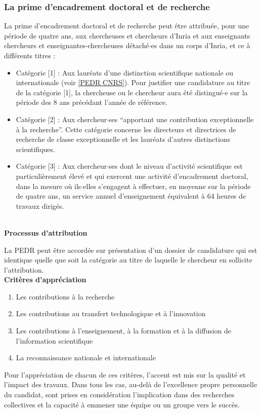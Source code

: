 \subsubsection*{La prime d'encadrement doctoral et de recherche}
\label{PEDR INRIA}

La prime d'encadrement doctoral et de recherche peut \^etre attribu\'ee, pour une p\'eriode de quatre ans, aux chercheuses et chercheurs d'Inria et aux enseignants chercheurs et enseignantes-chercheuses d\'etach\'e$\cdot$es dans un corps d'Inria, et ce \`a diff\'erents titres :
\begin{itemize}
\item Cat\'egorie [1] : Aux laur\'eats d'une distinction scientifique nationale ou internationale (voir \ref{PEDR CNRS}). Pour justifier une candidature au titre de la cat\'egorie [1], la chercheuse ou le chercheur aura \'et\'e distingu\'e$\cdot$e sur la p\'eriode des 8 ans pr\'ec\'edant l'ann\'ee de r\'ef\'erence.
\item Cat\'egorie [2] : Aux chercheur$\cdot$ses ``apportant une contribution exceptionnelle \`a la recherche''. Cette cat\'egorie concerne les directeurs et directrices de recherche de classe exceptionnelle et les laur\'eats d'autres distinctions scientifiques.
\item Cat\'egorie [3] : Aux chercheur$\cdot$ses dont le niveau d'activit\'e scientifique est particuli\`erement \'elev\'e et qui exercent une activit\'e d'encadrement doctoral, dans la mesure o\`u ils$\cdot$elles s'engagent \`a effectuer, en moyenne sur la p\'eriode de quatre ans, un service annuel d'enseignement \'equivalent \`a 64 heures de travaux dirig\'es.
\end{itemize}
~\\
{\bf Processus d'attribution}\\

La PEDR peut \^etre accord\'ee sur pr\'esentation d'un dossier de candidature qui est identique quelle que soit la cat\'egorie au titre de laquelle le chercheur en sollicite l'attribution.\\

{\bf Crit\`eres d'appr\'eciation}
\begin{enumerate}
\item Les contributions \`a la recherche
\item Les contributions au transfert technologique et \`a l'innovation
\item Les contributions \`a l'enseignement, \`a la formation et \`a la diffusion de l'information scientifique
\item La reconnaissance nationale et internationale
\end{enumerate}
Pour l'appr\'eciation de chacun de ces crit\`eres, l'accent est mis sur la qualit\'e et l'impact des travaux.
Dans tous les cas, au-del\`a de l'excellence propre personnelle du candidat, sont prises en consid\'eration l'implication dans des recherches collectives et la capacit\'e \`a emmener une \'equipe ou un groupe vers le succ\`es.\\

